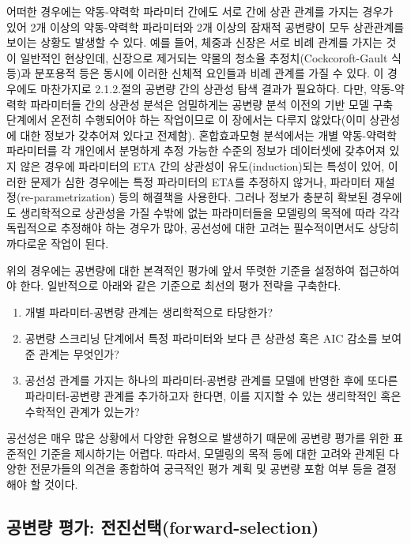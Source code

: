 \documentclass[
  10pt,
]{krantz}
\begin{document}
어떠한 경우에는 약동-약력학 파라미터 간에도 서로 간에 상관 관계를 가지는 경우가 있어 2개 이상의 약동-약력학 파라미터와 2개
이상의 잠재적 공변량이 모두 상관관계를 보이는 상황도 발생할 수 있다. 예를 들어, 체중과 신장은 서로 비례 관계를 가지는
것이 일반적인 현상인데, 신장으로 제거되는 약물의 청소율 추정치(Cockcoroft-Gault 식 등)과 분포용적 등은
동시에 이러한 신체적 요인들과 비례 관계를 가질 수 있다. 이 경우에도 마찬가지로 2.1.2.절의 공변량 간의 상관성 탐색
결과가 필요하다. 다만, 약동-약력학 파라미터들 간의 상관성 분석은 엄밀하게는 공변량 분석 이전의 기반 모델 구축 단계에서 온전히
수행되어야 하는 작업이므로 이 장에서는 다루지 않았다(이미 상관성에 대한 정보가 갖추어져 있다고 전제함). 혼합효과모형 분석에서는
개별 약동-약력학 파라미터를 각 개인에서 분명하게 추정 가능한 수준의 정보가 데이터셋에 갖추어져 있지 않은 경우에 파라미터의
ETA 간의 상관성이 유도(induction)되는 특성이 있어, 이러한 문제가 심한 경우에는 특정 파라미터의 ETA를 추정하지
않거나, 파라미터 재설정(re-parametrization) 등의 해결책을 사용한다. 그러나 정보가 충분히 확보된 경우에도
생리학적으로 상관성을 가질 수밖에 없는 파라미터들을 모델링의 목적에 따라 각각 독립적으로 추정해야 하는 경우가 많아, 공선성에
대한 고려는 필수적이면서도 상당히 까다로운 작업이 된다.

위의 경우에는 공변량에 대한 본격적인 평가에 앞서 뚜렷한 기준을 설정하여 접근하여야 한다. 일반적으로 아래와 같은 기준으로 최선의
평가 전략을 구축한다.

\begin{enumerate}
\def\labelenumi{\arabic{enumi})}
\item
  개별 파라미터-공변량 관계는 생리학적으로 타당한가?
\item
  공변량 스크리닝 단계에서 특정 파라미터와 보다 큰 상관성 혹은 AIC 감소를 보여준 관계는 무엇인가?
\item
  공선성 관계를 가지는 하나의 파라미터-공변량 관계를 모델에 반영한 후에 또다른 파라미터-공변량 관계를 추가하고자 한다면,
  이를 지지할 수 있는 생리학적인 혹은 수학적인 관계가 있는가?
\end{enumerate}

공선성은 매우 많은 상황에서 다양한 유형으로 발생하기 때문에 공변량 평가를 위한 표준적인 기준을 제시하기는 어렵다. 따라서,
모델링의 목적 등에 대한 고려와 관계된 다양한 전문가들의 의견을 종합하여 궁극적인 평가 계획 및 공변량 포함 여부 등을
결정해야 할 것이다.

\hypertarget{uxacf5uxbcc0uxb7c9-uxd3c9uxac00-uxc804uxc9c4uxc120uxd0ddforward-selection}{%
\subsection{공변량 평가: 전진선택(forward-selection)}\label{uxacf5uxbcc0uxb7c9-uxd3c9uxac00-uxc804uxc9c4uxc120uxd0ddforward-selection}}
\end{document}
